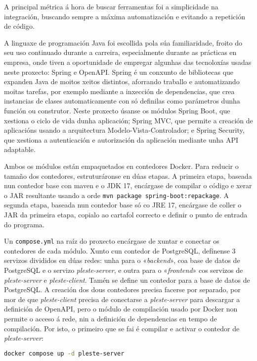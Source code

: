 A principal métrica á hora de buscar ferramentas foi a simplicidade na integración, buscando sempre a máxima automatización e evitando a repetición de código.

A linguaxe de programación Java foi escollida pola súa familiaridade, froito do seu uso continuado durante a carreira, especialmente durante as prácticas en empresa, onde tiven a oportunidade de empregar algunhas das tecnoloxías usadas neste proxecto: Spring e OpenAPI\cite{openapi}. Spring é un conxunto de bibliotecas que expanden Java de moitos xeitos distintos, aforrando traballo e automatizando moitas tarefas, por exemplo mediante a inxección de dependencias, que crea instancias de clases automaticamente con só definilas como parámetros dunha función ou construtor. Neste proxecto úsanse os módulos Spring Boot, que xestiona o ciclo de vida dunha aplicación; Spring MVC, que permite a creación de aplicacións usando a arquitectura Modelo-Vista-Controlador; e Spring Security, que xestiona a autenticación e autorización da aplicación mediante unha API adaptable.

Ambos os módulos están empaquetados en contedores Docker. Para reducir o tamaño dos contedores, estruturáronse en dúas etapas. A primeira etapa, baseada nun contedor base con maven e o JDK 17, encárgase de compilar o código e xerar o JAR resultante usando a orde \texttt{mvn package spring-boot:repackage}. A segunda etapa, baseada nun contedor base só co JRE 17, encárgase de coller o JAR da primeira etapa, copialo ao cartafol correcto e definir o punto de entrada do programa.

Un \texttt{compose.yml} na raíz do proxecto encárgase de xuntar e conectar os contedores de cada módulo. Xunto cun contedor de PostgreSQL, defínense 3 servizos divididos en dúas redes: unha para o «\textit{backend}», coa base de datos de PostgreSQL e o servizo \textit{pleste-server}, e outra para o «\textit{frontend}» cos servizos de \textit{pleste-server} e \textit{pleste-client}. Tamén se define un contedor para a base de datos de PostgreSQL. A creación dos dous contedores precisa facerse por separado, por mor de que \textit{pleste-client} precisa de conectarse a \textit{pleste-server} para descargar a definición de OpenAPI, pero o módulo de compilación usado por Docker non permite o acceso á rede, nin a definición de dependencias en tempo de compilación. Por isto, o primeiro que se fai é compilar e activar o contedor de \textit{pleste-server}:

\begin{lstlisting}[language=bash]
docker compose up -d pleste-server 
\end{lstlisting}

